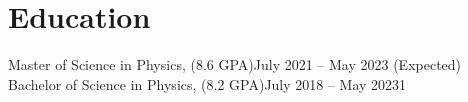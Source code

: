 
\section{Education}
\resumeHeadingListStart{}
{Master of Science in Physics, (8.6 GPA)}{July 2021 -- May 2023 (Expected)}
\resumeHeadingListEnd{}
\resumeHeadingListStart{}
{Bachelor of Science in Physics, (8.2 GPA)}{July 2018 -- May 20231}
\resumeHeadingListEnd{}